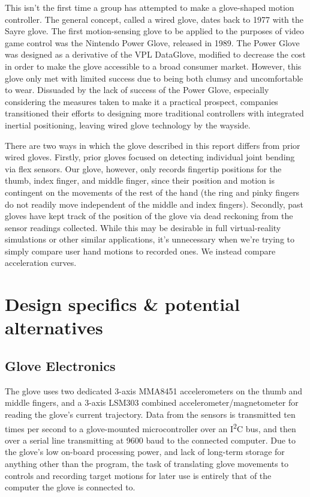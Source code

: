 \documentclass{article}
\begin{document}
	This isn't the first time a group has attempted to make a glove-shaped motion controller. The general concept, called a wired glove, dates back to 1977 with the Sayre glove. The first motion-sensing glove to be applied to the purposes of video game control was the Nintendo Power Glove, released in 1989. The Power Glove was designed as a derivative of the VPL DataGlove, modified to decrease the cost in order to make the glove accessible to a broad consumer market. However, this glove only met with limited success due to being both clumsy and uncomfortable to wear. Dissuaded by the lack of success of the Power Glove, especially considering the measures taken to make it a practical prospect, companies transitioned their efforts to designing more traditional controllers with integrated inertial positioning, leaving wired glove technology by the wayside.
	
	There are two ways in which the glove described in this report differs from prior wired gloves. Firstly, prior gloves focused on detecting individual joint bending via flex sensors. Our glove, however, only records fingertip positions for the thumb, index finger, and middle finger, since their position and motion is contingent on the movements of the rest of the hand (the ring and pinky fingers do not readily move independent of the middle and index fingers). Secondly, past gloves have kept track of the position of the glove via dead reckoning from the sensor readings collected. While this may be desirable in full virtual-reality simulations or other similar applications, it's unnecessary when we're trying to simply compare user hand motions to recorded ones. We instead compare acceleration curves.
	
	\section{Design specifics \& potential alternatives}
	\subsection*{Glove Electronics}
	
	The glove uses two dedicated 3-axis MMA8451 accelerometers on the thumb and middle fingers, and a 3-axis LSM303 combined accelerometer/magnetometer for reading the glove's current trajectory. Data from the sensors is transmitted ten times per second to a glove-mounted microcontroller over an I\textsuperscript{2}C bus, and then over a serial line transmitting at 9600 baud to the connected computer. Due to the glove's low on-board processing power, and lack of long-term storage for anything other than the program, the task of translating glove movements to controls and recording target motions for later use is entirely that of the computer the glove is connected to. 
	
\end{document}
